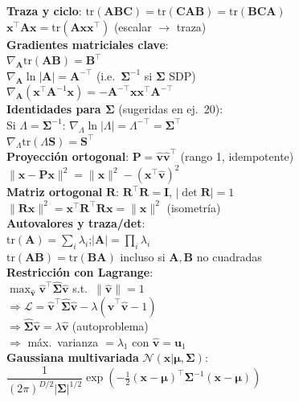 \documentclass[10pt, a4paper]{article}
\newcommand{\x}{\mathbf{x}}
\newcommand{\muu}{\boldsymbol{\mu}}
\newcommand{\Sig}{\boldsymbol{\Sigma}}
\begin{document}
\begin{minipage}[t]{0.3299\textwidth}
\begin{tcolorbox}[formulabox=Álgebra Lineal, colframe=softOrange]
    \textbf{Traza y ciclo}: $\text{tr}(\mathbf{ABC})=\text{tr}(\mathbf{CAB})=\text{tr}(\mathbf{BCA})$\\
    $\x^\top\mathbf{A}\x = \text{tr}(\mathbf{A}\x\x^\top)$ \quad (escalar $\to$ traza)\\[2pt]
    \textbf{Gradientes matriciales clave}:\\
    $\nabla_\mathbf{A}\text{tr}(\mathbf{A}\mathbf{B}) = \mathbf{B}^\top$\\
    $\nabla_\mathbf{A}\ln|\mathbf{A}| = \mathbf{A}^{-\top}$ (i.e.\ $\Sig^{-1}$ si $\Sig$ SDP)\\
    $\nabla_\mathbf{A}(\x^\top\mathbf{A}^{-1}\x) = -\mathbf{A}^{-\top}\x\x^\top\mathbf{A}^{-\top}$\\[2pt]
    \textbf{Identidades para $\Sig$} (sugeridas en ej.\ 20):\\
    Si $\Lambda=\Sig^{-1}$: $\nabla_\Lambda\ln|\Lambda|=\Lambda^{-\top}=\Sig^\top$\\
    $\nabla_\Lambda\text{tr}(\Lambda\mathbf{S}) = \mathbf{S}^\top$\\[2pt]
    \textbf{Proyección ortogonal}: $\mathbf{P}=\hat{\mathbf{v}}\hat{\mathbf{v}}^\top$ (rango 1, idempotente)\\
    $\|\x - \mathbf{P}\x\|^2 = \|\x\|^2 - (\x^\top\hat{\mathbf{v}})^2$\\[2pt]
    \textbf{Matriz ortogonal} $\mathbf{R}$: $\mathbf{R}^\top\mathbf{R}=\mathbf{I}$, $|\det\mathbf{R}|=1$\\
    $\|\mathbf{R}\x\|^2 = \x^\top\mathbf{R}^\top\mathbf{R}\x = \|\x\|^2$ (isometría)\\[2pt]
    \textbf{Autovalores y traza/det}:\\
    $\text{tr}(\mathbf{A})=\sum_i\lambda_i$;\quad $|\mathbf{A}|=\prod_i\lambda_i$\\
    $\text{tr}(\mathbf{AB})=\text{tr}(\mathbf{BA})$ incluso si $\mathbf{A},\mathbf{B}$ no cuadradas\\[2pt]
    \textbf{Restricción con Lagrange}: \\
    $\max_{\hat{\mathbf{v}}}\hat{\mathbf{v}}^\top\hat{\Sig}\hat{\mathbf{v}}$ s.t.\ $\|\hat{\mathbf{v}}\|=1$\\
    $\Rightarrow \mathcal{L} = \hat{\mathbf{v}}^\top\hat{\Sig}\hat{\mathbf{v}} - \lambda(\hat{\mathbf{v}}^\top\hat{\mathbf{v}}-1)$\\
    $\Rightarrow \hat{\Sig}\hat{\mathbf{v}}=\lambda\hat{\mathbf{v}}$ (autoproblema)\\
    $\Rightarrow$ máx.\ varianza $= \lambda_1$ con $\hat{\mathbf{v}}=\mathbf{u}_1$\\
    \textbf{Gaussiana multivariada} $\mathcal{N}(\x|\muu,\Sig)$:\\
    $\dfrac{1}{(2\pi)^{D/2}|\Sig|^{1/2}}\exp\!\left(-\tfrac{1}{2}(\x{-}\muu)^\top\Sig^{-1}(\x{-}\muu)\right)$\\
\end{tcolorbox}


\end{minipage}
\end{document}
